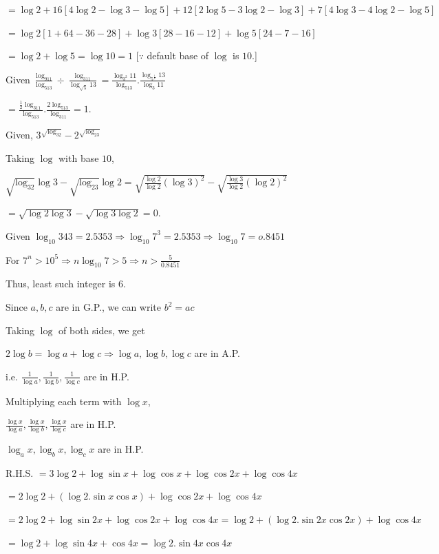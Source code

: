   $= \log 2 + 16[4\log 2 - \log 3 - \log 5] + 12[2\log 5 - 3\log 2 - \log 3] + 7[4\log 3 - 4\log 2 - \log 5]$

  $= \log 2[1 + 64 - 36 - 28] + \log 3[28 - 16 -12] + \log 5[24 - 7 - 16]$

  $= \log 2 + \log 5 = \log 10 = 1$ [$\because$ default base of $\log$ is $10$.]
\item Given $\frac{\log_911}{\log_513}\div\frac{\log_311}{\log_{\sqrt{5}}13} =
  \frac{\log_{3^2}11}{\log_513}.\frac{\log_{5^{\tfrac{1}{2}}}13}{\log_3 11}$

  $= \frac{\tfrac{1}{2}\log_311}{\log_513}.\frac{2\log_513}{\log_311} = 1$.
\item Given, $3^{\sqrt{\log_32}} - 2^{\sqrt{\log_23}}$

  Taking $\log$ with base $10$,

  $\sqrt{\log_32}\log 3 - \sqrt{\log_23}\log 2 = \sqrt{\frac{\log 2}{\log 2}(\log 3)^2} - \sqrt{\frac{\log 3}{\log 2}(\log 2)^2}$

  $= \sqrt{\log 2\log 3} - \sqrt{\log 3\log 2} = 0$.
\item Given $\log_{10}343 = 2.5353 \Rightarrow \log_{10}7^3 = 2.5353 \Rightarrow \log_{10}7 = o.8451$

  For $7^n > 10^5 \Rightarrow n\log_{10}7 > 5 \Rightarrow n > \frac{5}{0.8451}$

  Thus, least such integer is $6$.
\item Since $a, b, c$ are in G.P., we can write $b^2 = ac$

  Taking $\log$ of both sides, we get

  $2\log b = \log a + \log c \Rightarrow \log a, \log b, \log c$ are in A.P.

  i.e. $\frac{1}{\log a}, \frac{1}{\log b}, \frac{1}{\log c}$ are in H.P.

  Multiplying each term with $\log x$,

  $\frac{\log x}{\log a}, \frac{\log x}{\log b}, \frac{\log x}{\log c}$ are in H.P.

  $\log_ax, \log_bx, \log_cx$ are in H.P.
\item R.H.S. $= 3\log2 + \log\sin x + \log\cos x + \log\cos2x + \log\cos4x$

  $= 2\log 2 + (\log 2.\sin x\cos x) + \log\cos2x + \log\cos4x$

  $= 2\log 2 + \log\sin2x + \log\cos2x + \log\cos4x = \log 2 + (\log 2.\sin2x\cos2x) + \log\cos4x$

  $= \log 2 + \log\sin4x + \cos4x = \log 2.\sin4x\cos4x$


